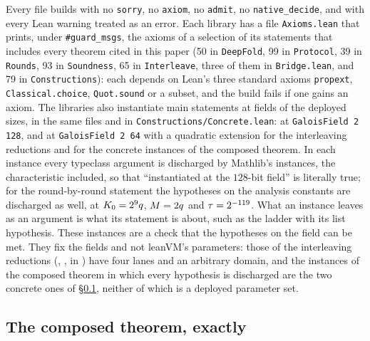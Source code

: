 Every file builds with no \texttt{sorry}, no \texttt{axiom}, no \texttt{admit}, no \texttt{native\_decide}, and with every Lean warning treated as an error. Each library has a file \texttt{Axioms.lean} that prints, under \texttt{\#guard\_msgs}, the axioms of a selection of its statements that includes every theorem cited in this paper (50 in \texttt{DeepFold}, 99 in \texttt{Protocol}, 39 in \texttt{Rounds}, 93 in \texttt{Soundness}, 65 in \texttt{Interleave}, three of them in \texttt{Bridge.lean}, and 79 in \texttt{Constructions}): each depends on Lean's three standard axioms \texttt{propext}, \texttt{Classical.choice}, \texttt{Quot.sound} or a subset, and the build fails if one gains an axiom. The libraries also instantiate main statements at fields of the deployed sizes, in the same files and in \texttt{Constructions/Concrete.lean}: at \texttt{GaloisField 2 128}, and at \texttt{GaloisField 2 64} with a quadratic extension for the interleaving reductions and for the concrete instances of the composed theorem. In each instance every typeclass argument is discharged by Mathlib's instances, the characteristic included, so that ``instantiated at the $128$-bit field'' is literally true; for the round-by-round statement  the hypotheses on the analysis constants are discharged as well, at $K_0=2^9q$, $M=2q$ and $\tau=2^{-119}$. What an instance leaves as an argument is what its statement is about, such as the ladder with its list hypothesis. These instances are a check that the hypotheses on the field can be met. They fix the fields and not leanVM's parameters: those of the interleaving reductions (, ,  in ) have four lanes and an arbitrary domain, and the instances of the composed theorem in which every hypothesis is discharged are the two concrete ones of \S\ref{sec:composed}, neither of which is a deployed parameter set.

\subsection{The composed theorem, exactly}\label{sec:composed}

